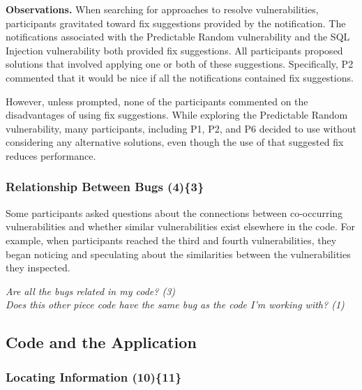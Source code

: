 \documentclass{acm_proc_article-sp}
\begin{document}
\noindent\textbf{Observations.}
When searching for approaches to resolve vulnerabilities, participants gravitated toward fix suggestions provided by the notification.
The notifications associated with the Predictable Random vulnerability and the SQL Injection vulnerability both provided fix suggestions.
All participants proposed solutions that involved applying one or both of these suggestions. 
Specifically, P2 commented that it would be nice if all the notifications contained fix suggestions.

However, unless prompted, none of the participants commented on the disadvantages of using fix suggestions.
While exploring the Predictable Random vulnerability, many participants, including P1, P2, and P6 decided to use  without considering any alternative solutions, even though the use of that suggested fix reduces performance.




\subsubsection{\textbf{Relationship Between Bugs (4)\{3\}}}\label{rbb}

Some participants asked questions about the connections between co-occurring vulnerabilities and whether similar vulnerabilities exist elsewhere in the code. 
For example, when participants reached the third and fourth vulnerabilities, they began noticing and speculating about the similarities between the vulnerabilities they inspected.


\noindent\emph{Are all the bugs related in my code? (3)} \\
\emph{Does this other piece code have the same bug as the code I'm working with? (1)} 



\subsection{Code and the Application}
\label{sec:results-ca}



\subsubsection{\textbf{Locating Information (10)\{11\}}}\label{li}
\end{document}
